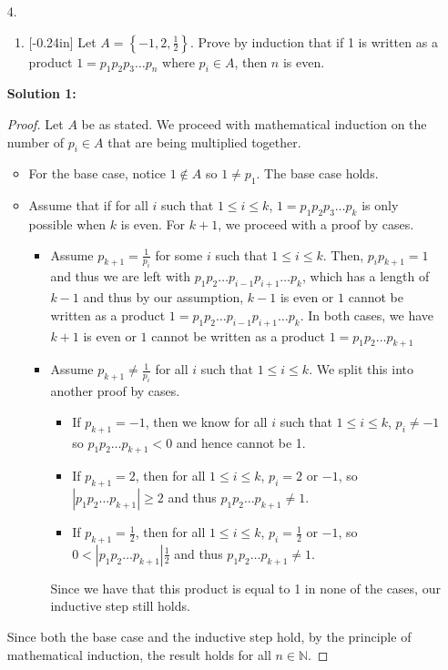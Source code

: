 \documentclass[letterpaper,12pt]{article}
\newcommand{\set}[1]{\left\{ #1 \right\}}
\theoremstyle{definition}
\begin{document}
\begin{enumerate}
    \item[4.]
 \begin{enumerate}
     \item  \reversemarginpar{}[-0.24in] 
 Let $A = \set{-1, 2, \frac{1}{2}}$. Prove by induction that if 1 is written as a product $1=p_1p_2p_3\ldots p_n$ where $p_i \in A$, then $n$ is even. 
 \end{enumerate}
 \begin{mdframed}
     \textbf{Solution 1:}
     \begin{proof}
         Let $A$ be as stated. We proceed with mathematical induction on the number of $p_i \in A$ that are being multiplied together. \begin{itemize}
             \item For the base case, notice $1 \notin A$ so $1 \neq p_1$. The base case holds.
             \item Assume that if for all $i$ such that $1 \leq i \leq k$, $1=p_1p_2p_3\ldots p_k$ is only possible when $k$ is even. For $k +1$, we proceed with a proof by cases.
             \begin{itemize}
                 \item Assume $p_{k+1} = \frac{1}{p_i}$ for some $i$ such that $1 \leq i \leq k$. Then, $p_i p_{k+1} = 1$ and thus we are left with $p_1p_2 \ldots p_{i-1}p_{i+1} \ldots p_k$, which has a length of $k-1$ and thus by our assumption, $k-1$ is even or $1$ cannot be written as a product $1 = p_1p_2 \ldots p_{i-1}p_{i+1} \ldots p_k$. In both cases, we have $k+1$ is even or $1$ cannot be written as a product $1 = p_1p_2 \ldots p_{k+1}$
                 \item Assume $p_{k+1} \neq \frac{1}{p_i}$ for all $i$ such that $1 \leq i \leq k$. We split this into another proof by cases. \begin{itemize}
                     \item If $p_{k+1} = -1$, then we know for all $i$ such that $1 \leq i \leq k$, $p_i \neq -1$ so $p_1p_2 \ldots p_{k+1} < 0$ and hence cannot be 1.
                     \item If $p_{k+1} =2$, then for all $1 \leq i \leq k$, $p_{i} = 2$ or $-1$, so $|p_1 p_2 \ldots p_{k+1}| \geq 2$ and thus $p_1 p_2 \ldots p_{k+1} \neq 1$. 
                     \item If $p_{k+1} = \frac{1}{2}$, then for all $1 \leq i \leq k$, $p_{i} = \frac{1}{2}$ or $-1$, so $0 < |p_1 p_2 \ldots p_{k+1}| \frac{1}{2}$ and thus $p_1 p_2 \ldots p_{k+1} \neq 1$. 
                 \end{itemize}
                Since we have that this product is equal to 1 in none of the cases, our inductive step still holds.
             \end{itemize}
         \end{itemize}
         Since both the base case and the inductive step hold, by the principle of mathematical induction, the result holds for all $n \in \mathbb{N}$.
     \end{proof}
 \end{mdframed}
\end{enumerate}
\end{document}
